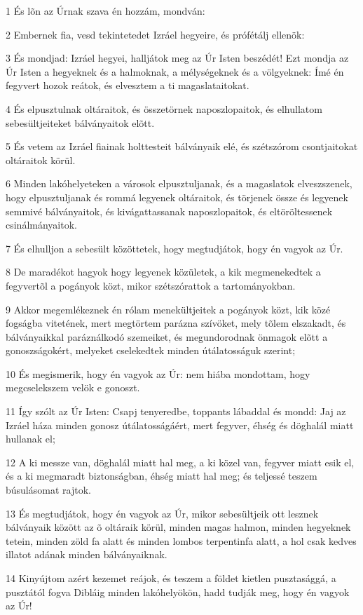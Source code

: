 \par 1 És lõn az Úrnak szava én hozzám, mondván:
\par 2 Embernek fia, vesd tekintetedet Izráel hegyeire, és prófétálj ellenök:
\par 3 És mondjad: Izráel hegyei, halljátok meg az Úr Isten beszédét! Ezt mondja az Úr Isten a hegyeknek és a halmoknak, a mélységeknek és a völgyeknek: Ímé én fegyvert hozok reátok, és elvesztem a ti magaslataitokat.
\par 4 És elpusztulnak oltáraitok, és összetörnek naposzlopaitok, és elhullatom sebesültjeiteket bálványaitok elõtt.
\par 5 És vetem az Izráel fiainak holttesteit bálványaik elé, és szétszórom csontjaitokat oltáraitok körül.
\par 6 Minden lakóhelyeteken a városok elpusztuljanak, és a magaslatok elveszszenek, hogy elpusztuljanak és rommá legyenek oltáraitok, és törjenek össze és legyenek semmivé bálványaitok, és kivágattassanak naposzlopaitok, és eltöröltessenek csinálmányaitok.
\par 7 És elhulljon a sebesült közöttetek, hogy megtudjátok, hogy én vagyok az Úr.
\par 8 De maradékot hagyok hogy legyenek közületek, a kik megmenekedtek a fegyvertõl a pogányok közt, mikor szétszórattok a tartományokban.
\par 9 Akkor megemlékeznek én rólam menekültjeitek a pogányok közt, kik közé fogságba vitetének, mert megtörtem parázna szívöket, mely tõlem elszakadt, és bálványaikkal paráználkodó szemeiket, és megundorodnak önmagok elõtt a gonoszságokért, melyeket cselekedtek minden útálatosságuk szerint;
\par 10 És megismerik, hogy én vagyok az Úr: nem hiába mondottam, hogy megcselekszem velök e gonoszt.
\par 11 Így szólt az Úr Isten: Csapj tenyeredbe, toppants lábaddal és mondd: Jaj az Izráel háza minden gonosz útálatosságáért, mert fegyver, éhség és döghalál miatt hullanak el;
\par 12 A ki messze van, döghalál miatt hal meg, a ki közel van, fegyver miatt esik el, és a ki megmaradt biztonságban, éhség miatt hal meg; és teljessé teszem búsulásomat rajtok.
\par 13 És megtudjátok, hogy én vagyok az Úr, mikor sebesültjeik ott lesznek bálványaik között az õ oltáraik körül, minden magas  halmon, minden hegyeknek tetein, minden zöld fa alatt és minden lombos terpentinfa alatt, a hol csak kedves illatot adának minden bálványaiknak.
\par 14 Kinyújtom azért kezemet reájok, és teszem a földet kietlen pusztasággá, a pusztától fogva Dibláig minden lakóhelyökön, hadd tudják meg, hogy én vagyok az Úr!

